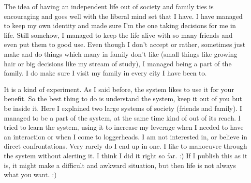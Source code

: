 {The idea of having an independent life out of society and family ties is encouraging and goes 
well with the liberal mind set that I have. I have managed to keep my own identity and made sure I'm the 
one taking decisions for me in life. Still somehow, I managed to keep the life alive with so many 
friends and even put them to good use. Even though I don't accept or rather, sometimes just make and do 
things which many in family don't like (small things like growing hair or big decisions like my 
stream of study), I managed being a part of the family. I do make sure I visit my family in every 
city I have been to. 

It is a kind of experiment. As I said before, the system likes to use it for your benefit. So the best 
thing to do is understand the system, keep it out of you but be inside it. Here I explained two 
large systems of society (friends and family). I managed to be a part of the system, at the same time 
kind of out of its reach. I tried to learn the system, using it to increase my leverage when I needed to have 
an interaction or when I come to loggerheads. I am not interested in, or believe in direct
confrontations. Very rarely do I end up in one. I like to manoeuvre through the system without 
alerting it. I think I did it right so far. :) If I publish this as it is, it might make a difficult 
and awkward situation, but then life is not always what you want. :)
}
\newpage 

